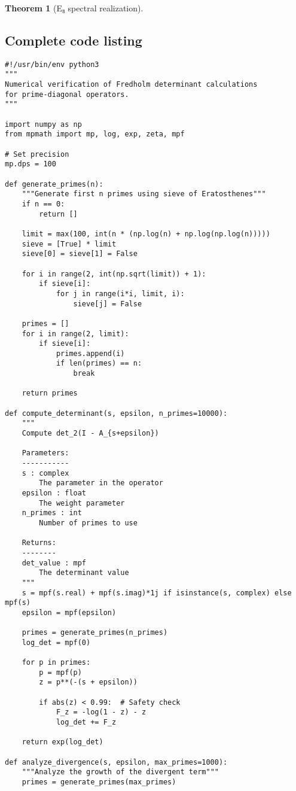 \documentclass[11pt,a4paper]{article}
\newtheorem{theorem}{Theorem}[section]
\theoremstyle{definition}
\theoremstyle{remark}
\begin{document}
\begin{theorem}[E₈ spectral realization]
\subsection{Complete code listing}

\begin{lstlisting}
#!/usr/bin/env python3
"""
Numerical verification of Fredholm determinant calculations
for prime-diagonal operators.
"""

import numpy as np
from mpmath import mp, log, exp, zeta, mpf

# Set precision
mp.dps = 100

def generate_primes(n):
    """Generate first n primes using sieve of Eratosthenes"""
    if n == 0:
        return []
    
    limit = max(100, int(n * (np.log(n) + np.log(np.log(n)))))
    sieve = [True] * limit
    sieve[0] = sieve[1] = False
    
    for i in range(2, int(np.sqrt(limit)) + 1):
        if sieve[i]:
            for j in range(i*i, limit, i):
                sieve[j] = False
    
    primes = []
    for i in range(2, limit):
        if sieve[i]:
            primes.append(i)
            if len(primes) == n:
                break
    
    return primes

def compute_determinant(s, epsilon, n_primes=10000):
    """
    Compute det_2(I - A_{s+epsilon})
    
    Parameters:
    -----------
    s : complex
        The parameter in the operator
    epsilon : float
        The weight parameter
    n_primes : int
        Number of primes to use
        
    Returns:
    --------
    det_value : mpf
        The determinant value
    """
    s = mpf(s.real) + mpf(s.imag)*1j if isinstance(s, complex) else mpf(s)
    epsilon = mpf(epsilon)
    
    primes = generate_primes(n_primes)
    log_det = mpf(0)
    
    for p in primes:
        p = mpf(p)
        z = p**(-(s + epsilon))
        
        if abs(z) < 0.99:  # Safety check
            F_z = -log(1 - z) - z
            log_det += F_z
    
    return exp(log_det)

def analyze_divergence(s, epsilon, max_primes=1000):
    """Analyze the growth of the divergent term"""
    primes = generate_primes(max_primes)
    

\end{lstlisting}
\end{theorem}
\end{document}
